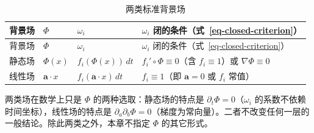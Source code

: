 \documentclass[
  chinese,
  a4paper,
  UTF8,
  12pt,
  oneside,
  openany]{ctexbook}
\theoremstyle{plain}
\theoremstyle{plain}
\theoremstyle{plain}
\theoremstyle{definition}
\theoremstyle{plain}
\theoremstyle{plain}
\theoremstyle{remark}
\begin{document}
\begin{longtable}[]{@{}
  >{\raggedright\arraybackslash}p{}
  >{\raggedright\arraybackslash}p{}
  >{\raggedright\arraybackslash}p{}
  >{\raggedright\arraybackslash}p{}@{}}
\caption{两类标准背景场}\label{tbl-fields}\tabularnewline
\toprule\noalign{}
\begin{minipage}[b]{\linewidth}\raggedright
背景场
\end{minipage} & \begin{minipage}[b]{\linewidth}\raggedright
\(\Phi\)
\end{minipage} & \begin{minipage}[b]{\linewidth}\raggedright
\(\omega_i\)
\end{minipage} & \begin{minipage}[b]{\linewidth}\raggedright
\(\omega_i\) 闭的条件（式~\ref{eq-closed-criterion}）
\end{minipage} \\
\midrule\noalign{}
\endfirsthead
\toprule\noalign{}
\begin{minipage}[b]{\linewidth}\raggedright
背景场
\end{minipage} & \begin{minipage}[b]{\linewidth}\raggedright
\(\Phi\)
\end{minipage} & \begin{minipage}[b]{\linewidth}\raggedright
\(\omega_i\)
\end{minipage} & \begin{minipage}[b]{\linewidth}\raggedright
\(\omega_i\) 闭的条件（式~\ref{eq-closed-criterion}）
\end{minipage} \\
\midrule\noalign{}
\endhead
\bottomrule\noalign{}
\endlastfoot
静态场 & \(\Phi(x)\) & \(f_i(\Phi(x))\,dt\) &
\(f_i'\circ\Phi\equiv0\)（含 \(f_i\equiv1\)）或 \(\nabla\Phi\equiv0\) \\
线性场 & \(\mathbf{a}\cdot x\) & \(f_i(\mathbf{a}\cdot x)\,dt\) &
\(f_i\equiv1\)（即 \(\mathbf{a}=0\) 或 \(f_i\) 常值） \\
\end{longtable}

两类场在数学上只是 \(\Phi\) 的两种选取：静态场的特点是
\(\partial_{t}\Phi=0\)（\(\omega_i\)
的系数不依赖时间坐标），线性场的特点是
\(\partial_{a}\partial_{b}\Phi=0\)（梯度为常向量）。二者不改变任何一层的一般结论。除此两类之外，本章不指定
\(\Phi\) 的其它形式。
\end{document}
